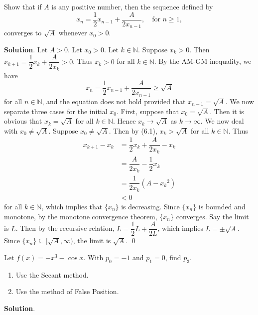\documentclass[11pt]{article}
\theoremstyle{break}
\numberwithin{equation}{theorem}
\begin{document}
\newpage
\begin{problem}\label{problem 6}
    Show that if $A$ is any positive number, then the sequence defined by
    \begin{equation*}
        x_n=\dfrac{1}{2}x_{n-1}+\dfrac{A}{2x_{n-1}},\quad\text{for $n\geq 1$},
    \end{equation*}
    converges to $\sqrt{A}$ whenever $x_0>0$.
\end{problem}
\textbf{Solution}. Let $A>0$. Let $x_0>0$. Let $k\in\mathbb{N}$. Suppose $x_k>0$. Then $x_{k+1}=\dfrac{1}{2}x_k+\dfrac{A}{2x_k}>0$. Thus $x_k>0$ for all $k\in\mathbb{N}$. By the AM-GM inequality, we have
\begin{equation}
    x_n=\dfrac{1}{2}x_{n-1}+\dfrac{A}{2x_{n-1}}\geq\sqrt{A}
\end{equation}
for all $n\in\mathbb{N}$, and the equation does not hold provided that $x_{n-1}=\sqrt{A}$. We now separate three cases for the initial $x_0$. First, suppose that $x_0=\sqrt{A}$. Then it is obvious that $x_k=\sqrt{A}$ for all $k\in\mathbb{N}$. Hence $x_k\to\sqrt{A}$ as $k\to\infty$. We now deal with $x_0\ne\sqrt{A}$. Suppose $x_0\ne\sqrt{A}$. Then by (6.1), $x_k>\sqrt{A}$ for all $k\in\mathbb{N}$. Thus
\begin{align*}
    x_{k+1}-x_{k}&=\dfrac{1}{2}x_{k}+\dfrac{A}{2x_{k}}-x_{k}\\
    &=\dfrac{A}{2x_{k}}-\dfrac{1}{2}x_{k}\\
    &=\dfrac{1}{2x_{k}}\left(A-{x_{k}}^2\right)\\
    &<0
\end{align*}
for all $k\in\mathbb{N}$, which implies that $\{x_n\}$ is decreasing. Since $\{x_n\}$ is bounded and monotone, by the monotone convergence theorem, $\{x_n\}$ converges. Say the limit is $L$. Then by the recursive relation, $L=\dfrac{1}{2}L+\dfrac{A}{2L}$, which implies $L=\pm\sqrt{A}$. Since $\{x_n\}\subseteq[\sqrt{A}, \infty)$, the limit is $\sqrt{A}$. \qed

\newpage
\begin{problem}\label{problem 7}
    Let $f(x)=-x^3-\cos x$. With $p_0=-1$ and $p_1=0$, find $p_3$.
    \begin{enumerate}
        \item Use the Secant method.
        \item Use the method of False Position.
    \end{enumerate}
\end{problem}
\textbf{Solution}.
\end{document}
